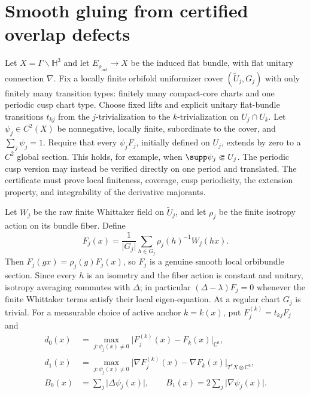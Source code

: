 \documentclass[11pt]{amsart}
\theoremstyle{definition}
\newcommand{\HH}{\mathbb H^3}
\newcommand{\CC}{\mathbb C}
\newcommand{\G}{\Gamma}
\newcommand{\abs}[1]{\lvert #1\rvert}
\newcommand{\rhoind}{\rho_{\mathrm{ind}}}
\newcommand{\D}{\Delta}
\begin{document}
\section{Smooth gluing from certified overlap defects}

Let $X=\G\backslash\HH$ and let $E_{\rhoind}\to X$ be the induced flat
bundle, with flat unitary connection $\nabla$. Fix a locally finite
orbifold uniformizer cover $(\widetilde U_j,G_j)$ with only finitely many
transition types: finitely many
compact-core charts and one periodic cusp chart type. Choose fixed lifts and
explicit unitary flat-bundle transitions $t_{kj}$ from the $j$-trivialization
to the $k$-trivialization on $U_j\cap U_k$. Let
$\psi_j\in C^2(X)$ be nonnegative, locally finite, subordinate to the
cover, and $\sum_j\psi_j=1$. Require that every $\psi_jF_j$, initially
defined on $U_j$, extends by zero to a $C^2$ global section. This holds, for
example, when $\supp\psi_j\Subset U_j$. The periodic cusp version may instead
be verified directly on one period and translated. The certificate must prove
local finiteness, coverage, cusp periodicity, the extension property, and
integrability of the derivative majorants.

Let $W_j$ be the raw finite Whittaker field on $\widetilde U_j$, and let
$\rho_j$ be the finite isotropy action on its bundle fiber. Define
\begin{equation}\label{eq:isotropyaverage}
 F_j(x)=\frac1{\abs{G_j}}\sum_{h\in G_j}\rho_j(h)^{-1}W_j(hx).
\end{equation}
Then $F_j(gx)=\rho_j(g)F_j(x)$, so $F_j$ is a genuine smooth local
orbibundle section. Since every $h$ is an isometry and the fiber action is
constant and unitary, isotropy averaging commutes with $\D$; in particular
$(\D-\lambda)F_j=0$ whenever the finite Whittaker terms satisfy their local
eigen-equation. At a regular chart $G_j$ is trivial. For a measurable choice
of active anchor $k=k(x)$, put
$F_j^{(k)}=t_{kj}F_j$ and
\begin{align}
 d_0(x)&=\max_{j:\psi_j(x)\ne0}
   \abs{F_j^{(k)}(x)-F_k(x)}_{\CC^6},\\
 d_1(x)&=\max_{j:\psi_j(x)\ne0}
   \abs{\nabla F_j^{(k)}(x)-\nabla F_k(x)}_{T^*X\otimes\CC^6},\\
 B_0(x)&=\sum_j\abs{\D\psi_j(x)},\qquad
 B_1(x)=2\sum_j\abs{\nabla\psi_j(x)}.
\end{align}
\end{document}
